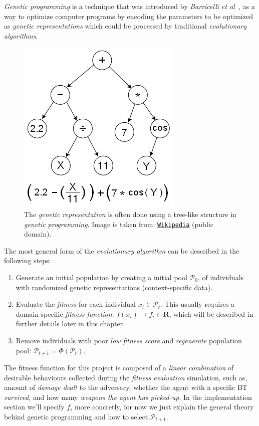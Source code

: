 \documentclass[a4paper, twocolumn]{article}
\begin{document}
	\emph{Genetic programming} is a technique that was introduced by \emph{Barricelli et al}~\cite{barricelli1954esempi}, as a way to optimize computer programs by encoding the parameters to be optimized as \emph{genetic representations} which could be processed by traditional \emph{evolutionary algorithms}.

	\begin{figure}[H]
        \centering
		\includegraphics[width=0.5\linewidth]{share/Genetic_Program_Tree.png}
        \caption{The \emph{genetic representation} is often done using a tree-like structure in \emph{genetic programming}. Image is taken from: \texttt{\href{https://upload.wikimedia.org/wikipedia/commons/7/77/Genetic\_Program\_Tree.png}{Wikipedia}} (public domain).}
		\label{fig:genetic_representation}
	\end{figure}

	The most general form of the \emph{evolutionary algorithm} can be described in the following steps:
    \begin{enumerate}
        \item Generate an initial population by creating a initial pool \(\mathcal{P}_0\), of individuals with randomized genetic representations (context-specific data).
        \item Evaluate the \emph{fitness} for each individual \(x_i \in \mathcal{P}_t\). This usually requires a domain-specific \emph{fitness function}: \(f(x_i)\rightarrow f_i \in \mathbf{R}\), which will be described in further details later in this chapter.
        \item Remove individuals with poor \textit{low fitness score} and \emph{regenerate} population pool: \(\mathcal{P}_{t+1} = \Phi(\mathcal{P}_t)\).
    \end{enumerate}

    The fitness function for this project is composed of a \emph{linear combination} of desirable behaviours collected during the \emph{fitness evaluation} simulation, such as, amount of \emph{damage dealt} to the adversary, whether the agent with a specific BT \emph{survived}, and how many \emph{weapons the agent has picked-up}. In the implementation section we'll specify \(f_i\) more concretly, for now we just explain the general theory behind genetic programming and how to select \(\mathcal{P}_{t+1}\).
\end{document}
